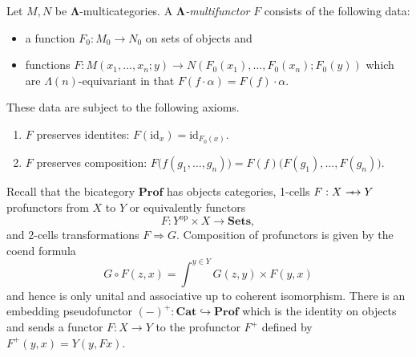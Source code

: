 \documentclass{amsbook} %
\newcommand{\mb}{\mathbf}
\newcommand{\id}{\textrm{id}}
\def\srarrow{\relbar\joinrel\mapstochar\joinrel\rightarrow}
\numberwithin{section}{chapter}
\begin{document}
\begin{Defi}
Let $M, N$ be $\mb{\Lambda}$-multicategories.  A \emph{$\mb{\Lambda}$-multifunctor} $F$ consists of the following data:
\begin{itemize}
\item a function $F_{0}:M_{0} \to N_{0}$ on sets of objects and
\item functions $F:M(x_1, \ldots, x_n; y) \to N(F_{0}(x_1), \ldots, F_{0}(x_n); F_{0}(y))$ which are $\Lambda(n)$-equivariant in that $F(f \cdot \alpha) = F(f) \cdot \alpha$.
\end{itemize}
These data are subject to the following axioms.
\begin{enumerate}
\item $F$ preserves identites: $F(\id_x) = \id_{F_{0}(x)}$.
\item $F$ preserves composition: $F\Big( f(g_1, \ldots, g_n) \Big) = F(f) \Big( F(g_1), \ldots, F(g_n) \Big).$
\end{enumerate}
\end{Defi}



Recall that the bicategory $\mb{Prof}$ has objects categories, 1-cells $F:X \srarrow Y$ profunctors from $X$ to $Y$ or equivalently functors
\[
F:Y^{\textrm{op}} \times X \rightarrow \mb{Sets},
\]
and 2-cells transformations $F \Rightarrow G$.  Composition of profunctors is given by the coend formula
\[
G \circ F (z,x) = \int^{y \in Y} G(z,y) \times F(y,x)
\]
and hence is only unital and associative up to coherent isomorphism.  There is an embedding pseudofunctor $(-)^{+}: \mb{Cat} \hookrightarrow \mb{Prof}$ which is the identity on objects and sends a functor $F:X \to Y$ to the profunctor $F^{+}$ defined by $F^{+}(y,x) = Y(y,Fx)$.
\end{document}
